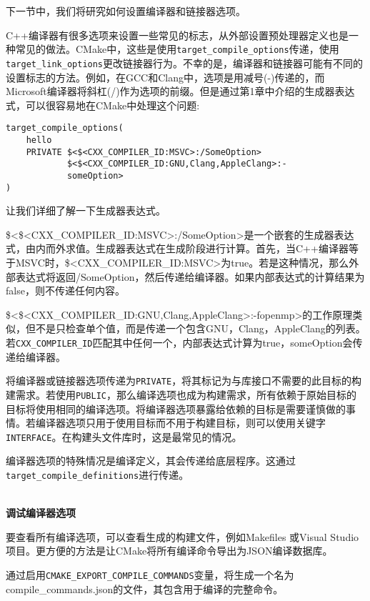 下一节中，我们将研究如何设置编译器和链接器选项。


C++编译器有很多选项来设置一些常见的标志，从外部设置预处理器定义也是一种常见的做法。CMake中，这些是使用\texttt{target\_compile\_options}传递，使用\texttt{target\_link\_options}更改链接器行为。不幸的是，编译器和链接器可能有不同的设置标志的方法。例如，在GCC和Clang中，选项是用减号(-)传递的，而Microsoft编译器将斜杠(/)作为选项的前缀。但是通过第1章中介绍的生成器表达式，可以很容易地在CMake中处理这个问题:

\begin{lstlisting}[style=styleCMake]
target_compile_options(
	hello
	PRIVATE $<$<CXX_COMPILER_ID:MSVC>:/SomeOption>
			$<$<CXX_COMPILER_ID:GNU,Clang,AppleClang>:-
			someOption>
)
\end{lstlisting}

让我们详细了解一下生成器表达式。

\$<\$<CXX\_COMPILER\_ID:MSVC>:/SomeOption>是一个嵌套的生成器表达式，由内而外求值。生成器表达式在生成阶段进行计算。首先，当C++编译器等于MSVC时，\$<CXX\_COMPILER\_ID:MSVC>为true。若是这种情况，那么外部表达式将返回/SomeOption，然后传递给编译器。如果内部表达式的计算结果为false，则不传递任何内容。

\$<\$<CXX\_COMPILER\_ID:GNU,Clang,AppleClang>:-fopenmp>的工作原理类似，但不是只检查单个值，而是传递一个包含GNU，Clang，AppleClang的列表。若\texttt{CXX\_COMPILER\_ID}匹配其中任何一个，内部表达式计算为true，someOption会传递给编译器。

将编译器或链接器选项传递为\texttt{PRIVATE}，将其标记为与库接口不需要的此目标的构建需求。若使用\texttt{PUBLIC}，那么编译选项也成为构建需求，所有依赖于原始目标的目标将使用相同的编译选项。将编译器选项暴露给依赖的目标是需要谨慎做的事情。若编译器选项只用于使用目标而不用于构建目标，则可以使用关键字\texttt{INTERFACE}。在构建头文件库时，这是最常见的情况。

编译器选项的特殊情况是编译定义，其会传递给底层程序。这通过\texttt{target\_compile\_definitions}进行传递。

\hspace*{\fill} \\ %
\noindent
\textbf{调试编译器选项}

要查看所有编译选项，可以查看生成的构建文件，例如Makefiles 或Visual Studio项目。更方便的方法是让CMake将所有编译命令导出为JSON编译数据库。

通过启用\texttt{CMAKE\_EXPORT\_COMPILE\_COMMANDS}变量，将生成一个名为compile\_commands.json的文件，其包含用于编译的完整命令。

